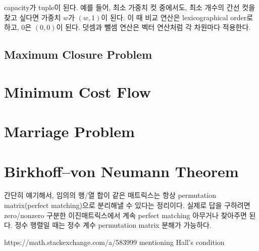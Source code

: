 \documentclass[10pt,twocolumn,letterpaper]{article}
\begin{document}
capacity가 tuple이 된다.
예를 들어, 최소 가중치 컷 중에서도, 최소 개수의 간선 컷을 찾고 싶다면 가중치 $w$가 $(w, 1)$이 된다.
이 때 비교 연산은 lexicographical order로 하고, $0$은 $(0, 0)$이 된다. 덧셈과 뺄셈 연산은 벡터 연산처럼 각 차원마다 적용한다.

\subsection{Maximum Closure Problem}

\section{Minimum Cost Flow}


\section{Marriage Problem}

\section{Birkhoff–von Neumann Theorem}

간단히 얘기해서, 임의의 행/열 합이 같은 매트릭스는 항상 permutation matrix(perfect matching)으로 분리해낼 수 있다는 정리이다.
실제로 답을 구하려면 zero/nonzero 구분한 이진매트릭스에서 계속 perfect matching 아무거나 찾아주면 된다.
정수 행렬일 때는 정수 계수 permutation matrix 분해가 가능하다.

https://math.stackexchange.com/a/583999
mentioning Hall's condition
\end{document}
